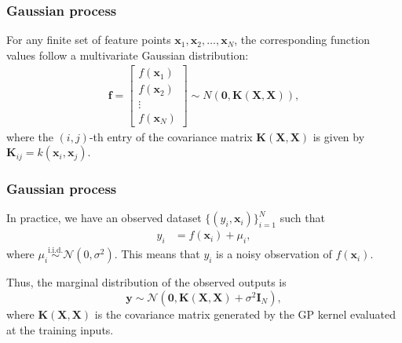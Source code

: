 \documentclass[12pt, compress]{beamer}
\begin{document}
\begin{frame}
	\frametitle{Gaussian process}
For any finite set of feature points \( \mathbf{x}_1, \mathbf{x}_2, \dots, \mathbf{x}_N \), the corresponding function values follow a multivariate Gaussian distribution:
\begin{align*}
	\mathbf{f} =
	\begin{bmatrix}
		f(\mathbf{x}_1) \\
		f(\mathbf{x}_2) \\
		\vdots \\
		f(\mathbf{x}_N)
	\end{bmatrix}
	\sim N(\mathbf{0}, \mathbf{K}(\mathbf{X}, \mathbf{X})),
\end{align*}
where the \( (i,j) \)-th entry of the covariance matrix \( \mathbf{K}(\mathbf{X}, \mathbf{X}) \) is given by \( \mathbf{K}_{ij} = k(\mathbf{x}_i, \mathbf{x}_j) \).
\end{frame}

\begin{frame}
	\frametitle{Gaussian process}
In practice, we have an observed dataset \( \{(y_i, \mathbf{x}_i)\}_{i=1}^N \) such that
\begin{align*}
	y_i &= f(\mathbf{x}_i) + \mu_i,
\end{align*}
where \( \mu_i \overset{\text{i.i.d.}}{\sim} \mathcal{N}(0, \sigma^2) \). This means that $y_i$ is a noisy observation of $f(\mathbf{x}_i)$.

Thus, the marginal distribution of the observed outputs is
\[
\mathbf{y} \sim \mathcal{N}(\mathbf{0}, \mathbf{K}(\mathbf{X}, \mathbf{X}) + \sigma^2 \mathbf{I}_N),
\]
where \( \mathbf{K}(\mathbf{X}, \mathbf{X}) \) is the covariance matrix generated by the GP kernel evaluated at the training inputs.

\end{frame}
\end{document}
